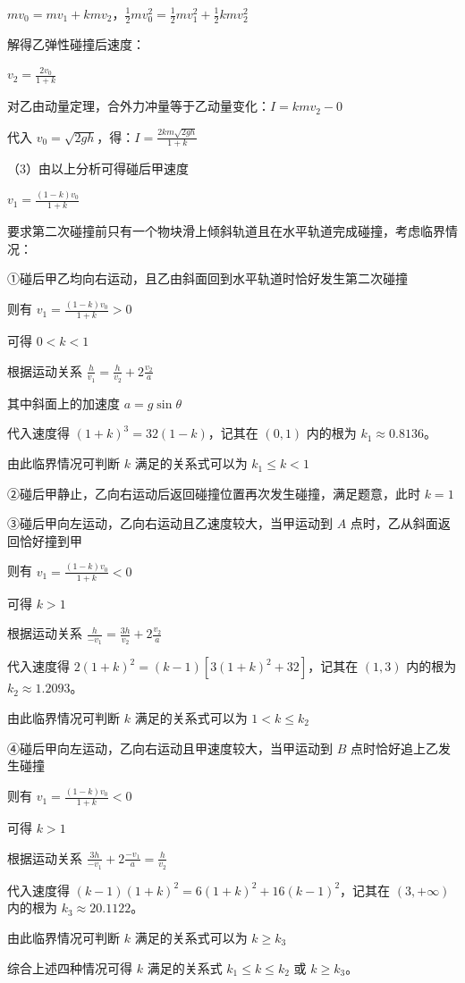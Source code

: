 \documentclass[\gkver]{gaokaozhenti}
\begin{document}
\begin{enumerate}
{$mv_{0} = mv_{1} + kmv_{2}$，$\frac{1}{2}mv_{0}^{2} = \frac{1}{2}mv_{1}^{2} + \frac{1}{2}kmv_{2}^{2}$

解得乙弹性碰撞后速度：

$v_{2} = \frac{2v_{0}}{1 + k}$

对乙由动量定理，合外力冲量等于乙动量变化：$I = kmv_{2} - 0$

代入 $v_{0} = \sqrt{2gh}$，得：$I = \frac{2km\sqrt{2gh}}{1 + k}$

（3）由以上分析可得碰后甲速度

$v_{1} = \frac{(1 - k)v_{0}}{1 + k}$

要求第二次碰撞前只有一个物块滑上倾斜轨道且在水平轨道完成碰撞，考虑临界情况：

①碰后甲乙均向右运动，且乙由斜面回到水平轨道时恰好发生第二次碰撞

则有 $v_{1} = \frac{(1 - k)v_{0}}{1 + k} > 0$

可得 $0 < k < 1$

根据运动关系 $\frac{h}{v_{1}} = \frac{h}{v_{2}} + 2\frac{v_{2}}{a}$

其中斜面上的加速度 $a = g \sin \theta$

代入速度得 $(1+k)^{3}=32(1-k)$，记其在 $(0,1)$ 内的根为 $k_{1}\approx0.8136$。

由此临界情况可判断 $k$ 满足的关系式可以为 $k_{1}\leqslant k<1$

②碰后甲静止，乙向右运动后返回碰撞位置再次发生碰撞，满足题意，此时 $k = 1$

③碰后甲向左运动，乙向右运动且乙速度较大，当甲运动到 $A$ 点时，乙从斜面返回恰好撞到甲

则有 $v_{1} = \frac{(1 - k)v_{0}}{1 + k} < 0$

可得 $k > 1$

根据运动关系 $\frac{h}{-v_{1}} = \frac{3h}{v_{2}} + 2\frac{v_{2}}{a}$

代入速度得 $2(1+k)^{2}=(k-1)[3(1+k)^{2}+32]$，记其在 $(1,3)$ 内的根为 $k_{2}\approx1.2093$。

由此临界情况可判断 $k$ 满足的关系式可以为 $1<k\leqslant k_{2}$

④碰后甲向左运动，乙向右运动且甲速度较大，当甲运动到 $B$ 点时恰好追上乙发生碰撞

则有 $v_{1} = \frac{(1 - k)v_{0}}{1 + k} < 0$

可得 $k > 1$

根据运动关系 $\frac{3h}{-v_{1}} + 2\frac{-v_{1}}{a} = \frac{h}{v_{2}}$

代入速度得 $(k-1)(1+k)^{2}=6(1+k)^{2}+16(k-1)^{2}$，记其在 $(3,+\infty)$ 内的根为 $k_{3}\approx20.1122$。

由此临界情况可判断 $k$ 满足的关系式可以为 $k\geqslant k_{3}$

综合上述四种情况可得 $k$ 满足的关系式 $k_{1}\leqslant k\leqslant k_{2}$ 或 $k\geqslant k_{3}$。
}

\end{enumerate}
\end{document}
